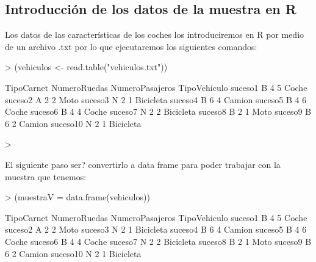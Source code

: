 \documentclass[a4paper]{article}
\begin{document}
\subsection{Introducción de los datos de la muestra en R}
Los datos de las características de los coches los introduciremos en R por medio de un archivo .txt por lo que ejecutaremos los siguientes comandos:
\begin{Schunk}
\begin{Sinput}
> (vehiculos <- read.table("vehiculos.txt"))
\end{Sinput}
\begin{Soutput}
         TipoCarnet NumeroRuedas NumeroPasajeros TipoVehiculo
suceso1           B            4               5        Coche
suceso2           A            2               2         Moto
suceso3           N            2               1    Bicicleta
suceso4           B            6               4       Camion
suceso5           B            4               6        Coche
suceso6           B            4               4        Coche
suceso7           N            2               2    Bicicleta
suceso8           B            2               1         Moto
suceso9           B            6               2       Camion
suceso10          N            2               1    Bicicleta
\end{Soutput}
\begin{Sinput}
> 
\end{Sinput}
\end{Schunk}
El siguiente paso ser? convertirlo a data frame para poder trabajar con la muestra que tenemos:
\begin{Schunk}
\begin{Sinput}
> (muestraV = data.frame(vehiculos))
\end{Sinput}
\begin{Soutput}
         TipoCarnet NumeroRuedas NumeroPasajeros TipoVehiculo
suceso1           B            4               5        Coche
suceso2           A            2               2         Moto
suceso3           N            2               1    Bicicleta
suceso4           B            6               4       Camion
suceso5           B            4               6        Coche
suceso6           B            4               4        Coche
suceso7           N            2               2    Bicicleta
suceso8           B            2               1         Moto
suceso9           B            6               2       Camion
suceso10          N            2               1    Bicicleta
\end{Soutput}
\end{Schunk}
\end{document}
